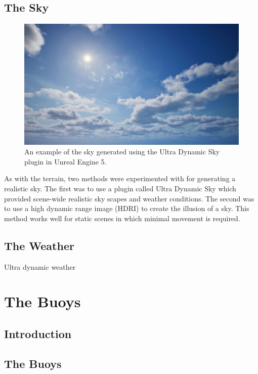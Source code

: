 \documentclass[10pt,twocolumn,letterpaper]{article}
\begin{document}
\subsection{The Sky}

\begin{figure}[t]
    \centering
    \includegraphics[width=\linewidth]{images/ultra_dynamic_sky.png}
    \caption{An example of the sky generated using the Ultra Dynamic Sky plugin in Unreal Engine 5.}
    \label{fig:sky_example}
\end{figure}

As with the terrain, two methods were experimented with for generating a realistic sky. The first was to use a plugin called Ultra Dynamic Sky \cite{UltraDynamicSky} which provided scene-wide realistic sky scapes and weather conditions. The second was to use a high dynamic range image (HDRI) to create the illusion of a sky. This method works well for static scenes in which minimal movement is required.


\subsection{The Weather}

Ultra dynamic weather

\section{The Buoys}

\subsection{Introduction}

\subsection{The Buoys} \label{sec:the_buoys}
\end{document}
